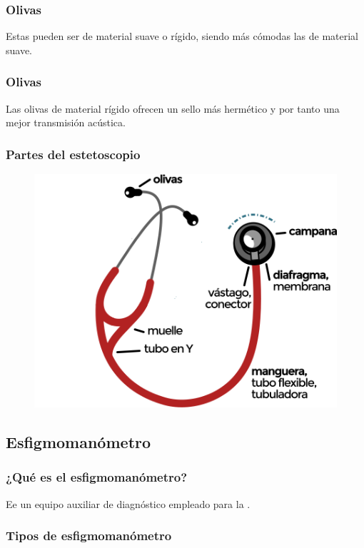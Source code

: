 \documentclass[14pt]{beamer}
\begin{document}
\begin{frame}
\frametitle{Olivas}
Estas pueden ser de material suave o rígido, siendo más cómodas las de material suave.
\end{frame}
\begin{frame}
\frametitle{Olivas}
Las olivas de material rígido ofrecen un sello más hermético y por tanto una mejor transmisión acústica.
\end{frame}
\begin{frame}
\frametitle{Partes del estetoscopio}
\vspace*{-1cm}
\begin{figure}
    \centering
    \includegraphics[scale=0.7]{Imagenes/Estetoscopio_06.png}
\end{figure}
\end{frame}

\subsection{Esfigmomanómetro}

\begin{frame}
\frametitle{¿Qué es el esfigmomanómetro?}
Ee un equipo auxiliar de diagnóstico empleado para la .
\end{frame}
\begin{frame}
\frametitle{Tipos de esfigmomanómetro}
\schema
    {
    }
    {
    }
\end{frame}
\end{document}
